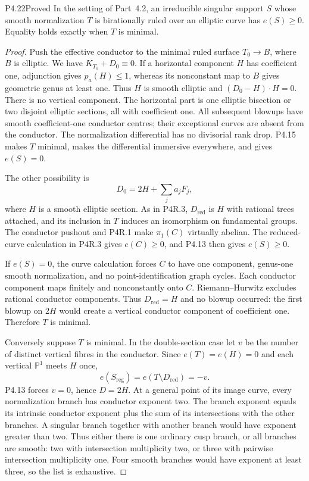 \begin{statement}{P4.22}{Proved}
In the setting of Part~4.2, an irreducible singular support
$S$ whose smooth normalization $T$ is birationally ruled
over an elliptic curve has $e(S)\ge0$. Equality holds
exactly when $T$ is minimal.
\end{statement}
\begin{proof}
Push the effective conductor to the minimal ruled
surface $T_0\to B$, where $B$ is elliptic. We have
$K_{T_0}+D_0\equiv0$. If a horizontal component $H$
has coefficient one, adjunction gives $p_a(H)\le1$,
whereas its nonconstant map to $B$ gives geometric
genus at least one. Thus $H$ is smooth elliptic and
$(D_0-H)\cdot H=0$. There is no vertical component.
The horizontal part is one elliptic bisection or two
disjoint elliptic sections, all with coefficient one.
All subsequent blowups have smooth coefficient-one
conductor centres; their exceptional curves are absent
from the conductor. The normalization differential
has no divisorial rank drop. P4.15 makes $T$ minimal,
makes the differential immersive everywhere, and
gives $e(S)=0$.

The other possibility is
\[
 D_0=2H+\sum_j a_jF_j,
\]
where $H$ is a smooth elliptic section. As in P4R.3,
$D_{\mathrm{red}}$ is $H$ with rational trees attached,
and its inclusion in $T$ induces an isomorphism on
fundamental groups. The conductor pushout and P4R.1
make $\pi_1(C)$ virtually abelian. The reduced-curve
calculation in P4R.3 gives $e(C)\ge0$, and P4.13 then
gives $e(S)\ge0$.

If $e(S)=0$, the curve calculation forces $C$ to have
one component, genus-one smooth normalization, and
no point-identification graph cycles. Each conductor
component maps finitely and nonconstantly onto $C$.
Riemann--Hurwitz excludes rational conductor
components. Thus $D_{\mathrm{red}}=H$ and no blowup
occurred: the first blowup on $2H$ would create a
vertical conductor component of coefficient one.
Therefore $T$ is minimal.

Conversely suppose $T$ is minimal. In the double-section
case let $v$ be the number of distinct vertical fibres
in the conductor. Since $e(T)=e(H)=0$ and each vertical
$\mathbb P^1$ meets $H$ once,
\[
 e(S_{\mathrm{reg}})=e(T\setminus D_{\mathrm{red}})=-v.
\]
P4.13 forces $v=0$, hence $D=2H$. At a general point
of its image curve, every normalization branch has
conductor exponent two. The branch exponent equals
its intrinsic conductor exponent plus the sum of its
intersections with the other branches. A singular
branch together with another branch would have
exponent greater than two. Thus either there is one
ordinary cusp branch, or all branches are smooth:
two with intersection multiplicity two, or three
with pairwise intersection multiplicity one. Four
smooth branches would have exponent at least three,
so the list is exhaustive.


\end{proof}
